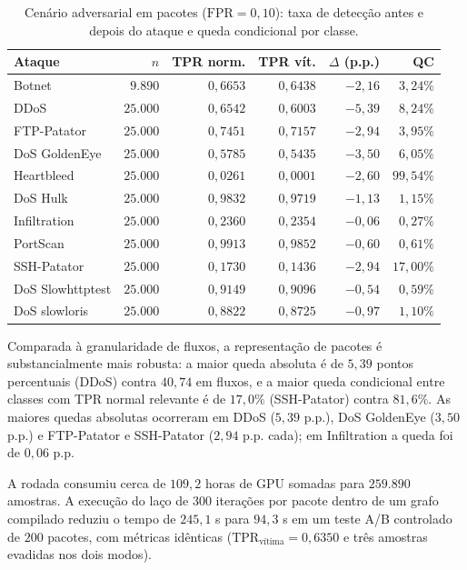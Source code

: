 \documentclass[conference]{IEEEtran}
\begin{document}
\begin{table}[!t]
\centering
\footnotesize
\setlength{\tabcolsep}{3.5pt}
\caption{Cenário adversarial em pacotes ($\text{FPR} = 0{,}10$): taxa de detecção antes e depois do ataque e queda condicional por classe.}
\label{tab:adv_pacotes}
\begin{tabular}{@{}lrrrrr@{}}
\toprule
\textbf{Ataque} & \textbf{$n$} & \textbf{TPR norm.} & \textbf{TPR vít.} & \textbf{$\Delta$ (p.p.)} & \textbf{QC} \\
\midrule
Botnet & $9.890$ & $0{,}6653$ & $0{,}6438$ & $-2{,}16$ & $3{,}24\%$ \\
DDoS & $25.000$ & $0{,}6542$ & $0{,}6003$ & $-5{,}39$ & $8{,}24\%$ \\
FTP-Patator & $25.000$ & $0{,}7451$ & $0{,}7157$ & $-2{,}94$ & $3{,}95\%$ \\
DoS GoldenEye & $25.000$ & $0{,}5785$ & $0{,}5435$ & $-3{,}50$ & $6{,}05\%$ \\
Heartbleed & $25.000$ & $0{,}0261$ & $0{,}0001$ & $-2{,}60$ & $99{,}54\%$ \\
DoS Hulk & $25.000$ & $0{,}9832$ & $0{,}9719$ & $-1{,}13$ & $1{,}15\%$ \\
Infiltration & $25.000$ & $0{,}2360$ & $0{,}2354$ & $-0{,}06$ & $0{,}27\%$ \\
PortScan & $25.000$ & $0{,}9913$ & $0{,}9852$ & $-0{,}60$ & $0{,}61\%$ \\
SSH-Patator & $25.000$ & $0{,}1730$ & $0{,}1436$ & $-2{,}94$ & $17{,}00\%$ \\
DoS Slowhttptest & $25.000$ & $0{,}9149$ & $0{,}9096$ & $-0{,}54$ & $0{,}59\%$ \\
DoS slowloris & $25.000$ & $0{,}8822$ & $0{,}8725$ & $-0{,}97$ & $1{,}10\%$ \\
\bottomrule
\end{tabular}
\end{table}

Comparada à granularidade de fluxos, a representação de pacotes é substancialmente mais robusta: a maior queda absoluta é de $5{,}39$ pontos percentuais (DDoS) contra $40{,}74$ em fluxos, e a maior queda condicional entre classes com TPR normal relevante é de $17{,}0\%$ (SSH-Patator) contra $81{,}6\%$.
As maiores quedas absolutas ocorreram em DDoS ($5{,}39$ p.p.), DoS GoldenEye ($3{,}50$ p.p.) e FTP-Patator e SSH-Patator ($2{,}94$ p.p. cada); em Infiltration a queda foi de $0{,}06$ p.p.

A rodada consumiu cerca de $109{,}2$ horas de GPU somadas para $259.890$ amostras.
A execução do laço de $300$ iterações por pacote dentro de um grafo compilado reduziu o tempo de $245{,}1$ s para $94{,}3$ s em um teste A/B controlado de $200$ pacotes, com métricas idênticas ($\text{TPR}_{\text{vítima}} = 0{,}6350$ e três amostras evadidas nos dois modos).
\end{document}
